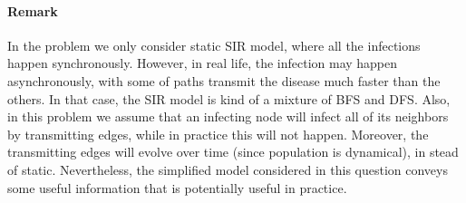 \documentclass{article}
\begin{document}
\paragraph{Remark}
In the problem we only consider static SIR model, where all the infections happen synchronously. However, in real life, the infection may happen asynchronously, with some of paths transmit the disease much faster than the others. In that case, the SIR model is kind of a mixture of BFS and DFS. Also, in this problem we assume that an infecting node will infect all of its neighbors by transmitting edges, while in practice this will not happen. Moreover, the transmitting edges will evolve over time (since population is dynamical), in stead of static. Nevertheless, the simplified model considered in this question conveys some useful information that is potentially useful in practice.
\end{document}
